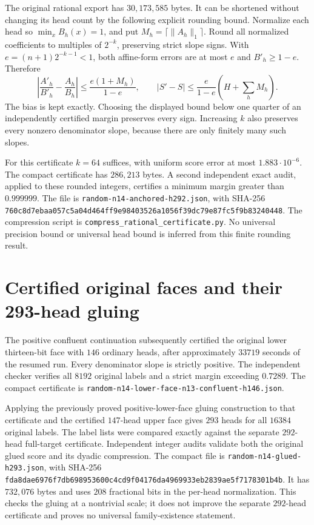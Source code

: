 \documentclass[11pt]{article}
\begin{document}
The original rational export has $30{,}173{,}585$ bytes. It can be
shortened without changing its head count by the following explicit
rounding bound. Normalize each head so $\min_x B_h(x)=1$, and put
$M_h=\lceil\|A_h\|_1\rceil$. Round all normalized coefficients to
multiples of $2^{-k}$, preserving strict slope signs. With
$e=(n+1)2^{-k-1}<1$, both affine-form errors are at most $e$ and
$B'_h\ge1-e$. Therefore
\[
 \left|\frac{A'_h}{B'_h}-\frac{A_h}{B_h}\right|
 \le\frac{e(1+M_h)}{1-e},\qquad
 |S'-S|\le\frac{e}{1-e}\left(H+\sum_hM_h\right).
\]
The bias is kept exactly. Choosing the displayed bound below one
quarter of an independently certified margin preserves every sign.
Increasing $k$ also preserves every nonzero denominator slope, because
there are only finitely many such slopes.

For this certificate $k=64$ suffices, with uniform score error at most
$1.883\cdot10^{-6}$. The compact certificate has $286{,}213$ bytes.
A second independent exact audit, applied to these rounded integers,
certifies a minimum margin greater than $0.999999$. The file is
\texttt{random-n14-anchored-h292.json}, with SHA-256
\texttt{760c8d7ebaa057c5a04d464ff9e98403526a1056f39dc79e87fc5f9b83240448}.
The compression script is \texttt{compress\_rational\_certificate.py}.
No universal precision bound or universal head bound is inferred from
this finite rounding result.

\section{Certified original faces and their 293-head gluing}

The positive confluent continuation subsequently certified the original
lower thirteen-bit face with $146$ ordinary heads, after approximately
$33719$ seconds of the resumed run. Every denominator slope is strictly
positive. The independent checker verifies all $8192$ original labels
and a strict margin exceeding $0.7289$. The compact certificate is
\texttt{random-n14-lower-face-n13-confluent-h146.json}.

Applying the previously proved positive-lower-face gluing construction
to that certificate and the certified $147$-head upper face gives
$293$ heads for all $16384$ original labels. The label lists were
compared exactly against the separate $292$-head full-target certificate.
Independent integer audits validate both the original glued score and
its dyadic compression. The compact file is
\texttt{random-n14-glued-h293.json}, with SHA-256
\texttt{fda8dae6976f7db698953600c4cd9f04176da4969933eb2839ae5f7178301b4b}.
It has $732{,}076$ bytes and uses $208$ fractional bits in the
per-head normalization. This checks the gluing at a nontrivial scale;
it does not improve the separate $292$-head certificate and proves
no universal family-existence statement.
\end{document}

